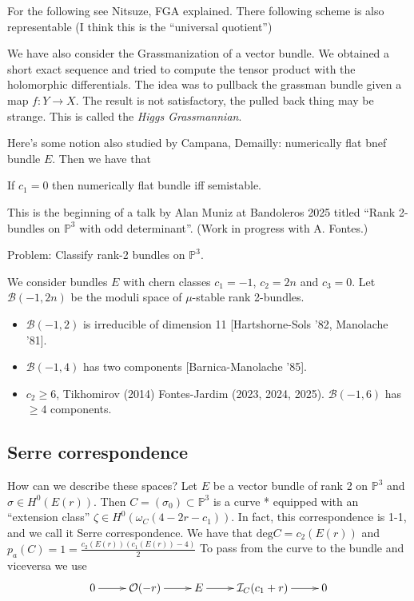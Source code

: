 For the following see Nitsuze, FGA explained.
There following scheme is also representable
(I think this is the ``universal quotient'')

We have also consider the Grassmanization of a vector bundle.
We obtained a short exact sequence
and tried to compute the tensor product with
the holomorphic differentials.
The idea was to pullback the grassman bundle
given a map $f:Y \to X$.
The result is not satisfactory, the pulled back
thing may be strange. This is called the
{\it Higgs Grassmannian}.


Here's some notion also studied by Campana, Demailly:
numerically flat bnef bundle $E$.
Then we have that 
\begin{lemma}
\label{lemma-proof-hugo-bruzzo}
If $c_1=0$ then numerically flat bundle iff semistable.
\end{lemma}

\medskip\noindent
This is the beginning of a talk by Alan Muniz
at Bandoleros 2025 titled
``Rank 2-bundles on $\mathbb{P}^3$ with odd determinant''.
(Work in progress with A. Fontes.)

Problem: Classify rank-2 bundles on $\mathbb{P}^3$.

We consider bundles $E$ with chern classes
$c_1=-1$, $c_2=2n$ and $c_3=0$.
Let $\mathcal{B}(-1,2n)$ be the moduli space
of $\mu$-stable rank 2-bundles.

\begin{itemize}
\item $\mathcal{B}(-1,2)$ is irreducible of dimension 11
[Hartshorne-Sols '82, Manolache '81].

\item $\mathcal{B}(-1,4)$ has two components
[Barnica-Manolache '85].

\item $c_2\geq 6$, Tikhomirov (2014)
Fontes-Jardim (2023, 2024, 2025).
$\mathcal{B}(-1,6)$ has $\geq 4$ components.
\end{itemize}

\medskip\noindent
\subsection*{Serre correspondence}
How can we describe these spaces?
Let $E$ be a vector bundle of rank 2
on $\mathbb{P}^3$ and $\sigma \in H^0(E(r))$.
Then $C=(\sigma_0)\subset \mathbb{P}^3$ is
a curve * equipped
with an ``extension class''
$\zeta \in H^0(\omega_C(4-2r-c_1))$.
In fact, this correspondence
is 1-1, and we call it Serre correspondence.
We have that $\text{deg}C=c_2(E(r))$ and
$p_a(C)=1=\frac{c_2(E(r))(c_1(E(r))-4)}{2}$
To pass from the curve to the bundle
and viceversa we use
$$
\xymatrix{
0\ar[r]
&\mathcal{O}(-r)\ar[r]
&E\ar[r]
&\mathcal{I}_C(c_1+r)\ar[r]
&0
}
$$


